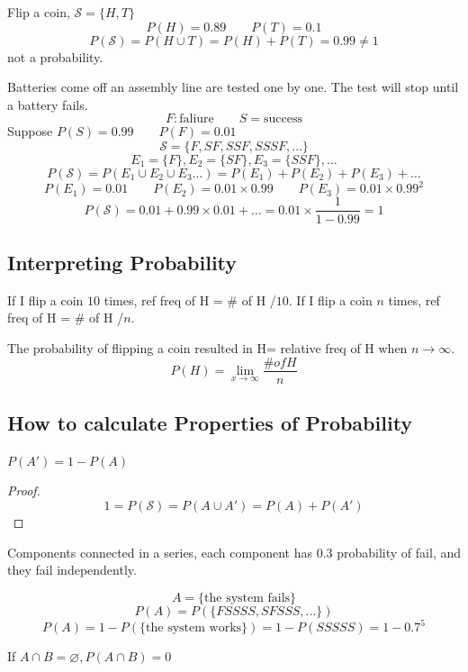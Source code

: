 \begin{exmp}
Flip a coin, $\mathcal{S}=\{H,T\}$
\[P(H)=0.89 \qquad P(T)=0.1\]
\[P(\mathcal{S})=P(H \cup T)=P(H)+P(T)=\boxed{0.99} \neq 1		\]
not a probability.
\end{exmp}

\begin{exmp}
Batteries come off an assembly line are tested one by one. The test will stop until a battery fails.
\[F:\text{faliure} \qquad S=\text{success}\]
Suppose $P(S)=0.99 \qquad P(F)=0.01$
\[\mathcal{S}=\{ F,SF,SSF,SSSF,\dots		\}\]
\[E_1=\{F\},E_2=\{SF\},E_3=\{SSF\},\dots		\]
\[P(\mathcal{S})=P(E_1 \cup E_2 \cup E_3 \dots)=P(E_1)+P(E_2)+P(E_3)+\dots\]
\[P(E_1)=0.01 \qquad P(E_2)=0.01\times0.99 \qquad P(E_3)=0.01\times 0.99^2\]
\[P(\mathcal{S})=0.01+0.99\times0.01+\dots=0.01\times\frac{1}{1-0.99}=1\]
\end{exmp}

\subsection{Interpreting Probability}
\begin{exmp}
If I flip a coin $10$ times, ref freq of H = \# of H /$10$. If I flip a coin $n$ times, ref freq of H = \# of H /$n$.

The probability of flipping a coin resulted in H= relative freq of H when $n\to \infty$. 
\[P(H)=\lim _{x \to \infty} \frac{\# of H}{n}\]
\end{exmp}

\subsection{How to calculate Properties of Probability}

\begin{prop}
$P(A')=1 -P(A) $
\begin{proof}
\[1=P(\mathcal{S})=P(A \cup A')=P(A)+P(A')\]
\end{proof}
\end{prop}
  
\begin{exmp}
Components connected in a series, each component has 0.3 probability of fail, and they fail independently.
   
\[A=\{\text{the system fails}\}\]
\[P(A)=P(\{ FSSSS,SFSSS,\dots\})\]
\[P(A)=1-P(\{\text{the system works}\})=1-P(SSSSS)=1-0.7^5\]
\end{exmp}
  
\begin{prop}
  If $A\cap B =\varnothing, P(A \cap B)=0 $
\end{prop}
  
